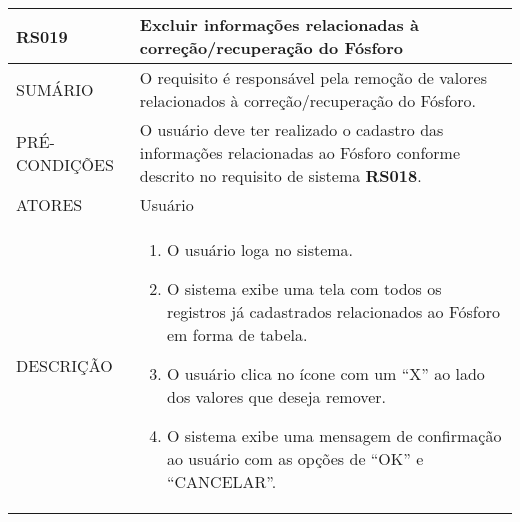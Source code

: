  

\begin{longtable}[c]{@{}|p{4cm}|p{9cm}|@{}}
\hline
\begin{minipage}[t]{0.47\columnwidth}
\textbf{RS019}
\end{minipage} & \begin{minipage}[t]{0.47\columnwidth}
Excluir informações relacionadas à correção/recuperação do Fósforo
\end{minipage}
\\\hline
\begin{minipage}[t]{0.47\columnwidth}
SUMÁRIO
\end{minipage} & \begin{minipage}[t]{0.47\columnwidth}
O requisito é responsável pela remoção de valores relacionados à
correção/recuperação do Fósforo.
\end{minipage}
\\\hline
\begin{minipage}[t]{0.47\columnwidth}
PRÉ-CONDIÇÕES
\end{minipage} & \begin{minipage}[t]{0.47\columnwidth}
O usuário deve ter realizado o cadastro das informações relacionadas ao
Fósforo conforme descrito no requisito de sistema \textbf{RS018}.
\end{minipage}
\\\hline
\begin{minipage}[t]{0.47\columnwidth}
ATORES
\end{minipage} & \begin{minipage}[t]{0.47\columnwidth}
Usuário
\end{minipage}
\\\hline
\begin{minipage}[t]{0.47\columnwidth}
DESCRIÇÃO
\end{minipage} & \begin{minipage}[t]{0.47\columnwidth}
\begin{enumerate}
\def\labelenumi{\arabic{enumi}.}
\itemsep1pt\parskip0pt\parsep0pt
\item
  O usuário loga no sistema.
\item
  O sistema exibe uma tela com todos os registros já cadastrados
  relacionados ao Fósforo em forma de tabela.
\item
  O usuário clica no ícone com um ``X'' ao lado dos valores que deseja
  remover.
\item
  O sistema exibe uma mensagem de confirmação ao usuário com as opções
  de ``OK'' e ``CANCELAR''.

\end{enumerate}
\end{minipage}
\end{longtable}
